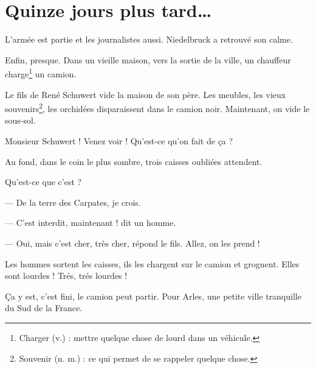 \chapter{Quinze jours plus tard\ldots{}}
L'armée est partie et les journalistes aussi. Niedelbruck a retrouvé son calme.

Enfin, presque. Dans un vieille maison, vers la sortie de la ville, un chauffeur charge\footnote{Charger (v.) : mettre quelque
chose de lourd dans un véhicule.} un camion.

Le fils de René Schuwert vide la maison de son père. Les meubles, les vieux souvenirs\footnote{Souvenir (n. m.) : ce qui permet
de se rappeler quelque chose.}, les orchidées disparaissent dans le camion noir. Maintenant, on vide le sous-sol.

\og Monsieur Schuwert ! Venez voir ! Qu'est-ce qu'on fait de \c{c}a ? \fg{}

Au fond, dans le coin le plus sombre, trois caisses oubliées attendent.

\og Qu'est-ce que c'est ?

--- De la terre des Carpates, je crois.

--- C'est interdit, maintenant ! dit un homme.

--- Oui, mais c'est cher, très cher, répond le fils. Allez, on les prend ! \fg{}

Les hommes sortent les caisses, ils les chargent sur le camion et grognent. Elles sont lourdes ! Trés, trés lourdes !

\c{C}a y est, c'est fini, le camion peut partir. Pour Arles, une petite ville tranquille du Sud de la France.
